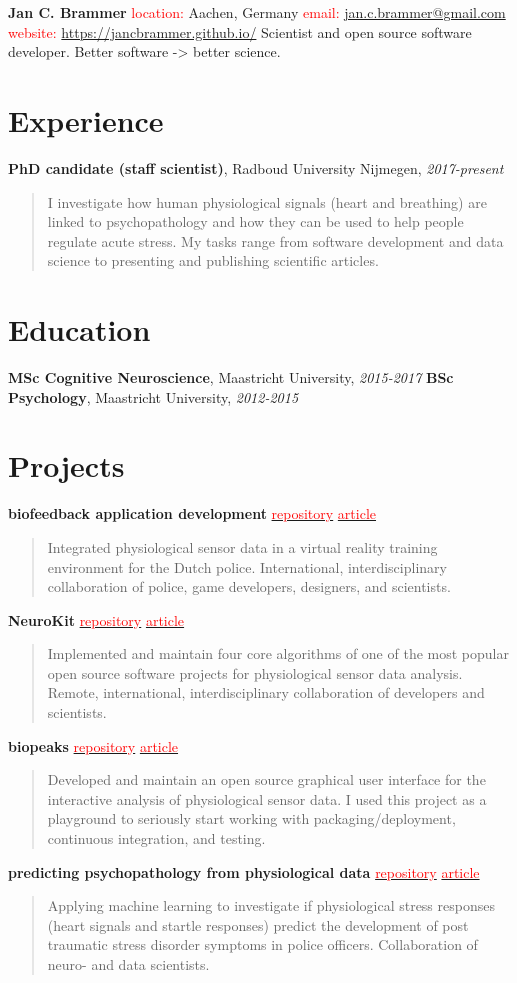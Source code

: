 \documentclass[a4paper, 10pt]{article}
\newcommand{\Head}[3]{
    \noindent \textbf{\Huge Jan C. Brammer} \bigskip \newline
    \textcolor{red}{location:} Aachen, Germany \newline
    \textcolor{red}{email:} \href{mailto:#1}{#1} \newline
    \textcolor{red}{website:} \url{#2} \bigskip \newline
    {#3}
}
\newcommand{\NewSection}[1]{\section*{\Large #1 \hrulefill}}
\newcommand{\EducationItem}[3]{\textbf{#1}, #2, \textit{#3} \newline}
\newcommand{\ExperienceItem}[4]{\textbf{#1}, #2, \textit{#3} {\newline \begin{quote}  \vspace{-\baselineskip} #4 \vspace{\baselineskip} \end{quote}}}
\newcommand{\Project}[4]{\noindent \textbf{#1} \newline
    \href{#2}{\textcolor{red}{repository}} \textbar{} \href{#3}{\textcolor{red}{article}} \newline
    \begin{quote} \vspace{-\baselineskip} #4 \vspace{\baselineskip} \end{quote}
}
\begin{document}
\Head{jan.c.brammer@gmail.com}
{https://jancbrammer.github.io/}
{Scientist and open source software developer. Better software -> better science.}


\NewSection{Experience}
\ExperienceItem{PhD candidate (staff scientist)}
{Radboud University Nijmegen}
{2017-present}
{I investigate how human physiological signals (heart and breathing) are linked to psychopathology and how they can be used to help people regulate acute stress. My tasks range from software development and data science to presenting and publishing scientific articles.}


\NewSection{Education}
\EducationItem{MSc Cognitive Neuroscience}{Maastricht University}{2015-2017}
\EducationItem{BSc Psychology}{Maastricht University}{2012-2015}


\NewSection{Projects}
\Project{biofeedback application development}
{}
{https://github.com/JanCBrammer/JanCBrammer.github.io/raw/gh-pages/frontiers_article.pdf}
{Integrated physiological sensor data in a virtual reality training environment for the Dutch police. International, interdisciplinary collaboration of police, game developers, designers, and scientists.}

\Project{NeuroKit}
{https://github.com/neuropsychology/NeuroKit}
{https://github.com/JanCBrammer/JanCBrammer.github.io/raw/gh-pages/neurokit_article.pdf}
{Implemented and maintain four core algorithms of one of the most popular open source software projects for physiological sensor data analysis. Remote, international, interdisciplinary collaboration of developers and scientists.}

\pagebreak
\Project{biopeaks}
{https://github.com/JanCBrammer/biopeaks}
{https://github.com/JanCBrammer/JanCBrammer.github.io/raw/gh-pages/biopeaks_article.pdf}
{Developed and maintain an open source graphical user interface for the interactive analysis of physiological sensor data. I used this project as a playground to seriously start working with packaging/deployment, continuous integration, and testing.}

\Project{predicting psychopathology from physiological data}
{https://github.com/JanCBrammer/PoliceInAction_PTSD_prediction}
{https://osf.io/3kjua/}
{Applying machine learning to investigate if physiological stress responses (heart signals and startle responses) predict the development of post traumatic stress disorder symptoms in police officers. Collaboration of neuro- and data scientists.}
\end{document}
